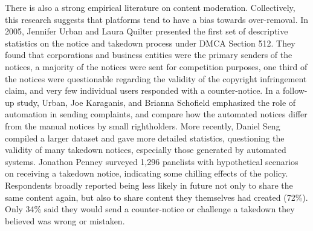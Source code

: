 There is also a strong empirical literature on content moderation. Collectively, this research suggests that platforms tend to have a bias towards over-removal.  In 2005, Jennifer Urban and Laura Quilter presented the first set of descriptive statistics on the notice and takedown process under DMCA Section 512. They found that corporations and business entities were the primary senders of the notices, a majority of the notices were sent for competition purposes, one third of the notices were questionable regarding the validity of the copyright infringement claim, and very few individual users responded with a counter-notice. In a follow-up study, Urban, Joe Karaganis, and Brianna Schofield emphasized the role of automation in sending complaints, and compare how the automated notices differ from the manual notices by small rightholders. More recently, Daniel Seng compiled a larger dataset and gave more detailed statistics, questioning the validity of many takedown notices, especially those generated by automated systems. Jonathon Penney surveyed 1,296 panelists with hypothetical scenarios on receiving a takedown notice, indicating some chilling effects of the policy. Respondents broadly reported being less likely in future not only to share the same content again, but also to share content they themselves had created (72\%). Only 34\% said they would send a counter-notice or challenge a takedown they believed was wrong or mistaken. 

